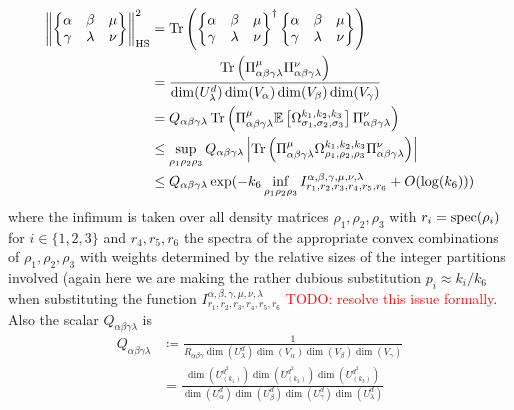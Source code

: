 \documentclass[notitlepage]{article}
\begin{document}
\begin{align}
    \left\lVert\begin{Bmatrix}\alpha & \beta & \mu \\ \gamma & \lambda & \nu \end{Bmatrix}\right\rVert_{\mathrm{HS}}^2
    &= \operatorname{Tr}\left(\begin{Bmatrix}\alpha & \beta & \mu \\ \gamma & \lambda & \nu \end{Bmatrix}^{\dagger}\begin{Bmatrix}\alpha & \beta & \mu \\ \gamma & \lambda & \nu \end{Bmatrix}\right) \\
    &= \frac{\operatorname{Tr}\left(\Pi_{\alpha\beta\gamma\lambda}^{\mu}\Pi_{\alpha\beta\gamma\lambda}^{\nu}\right)}{\dim(U^{d}_{\lambda})\dim(V_\alpha)\dim(V_{\beta})\dim(V_{\gamma})} \\
    &= Q_{\alpha\beta\gamma\lambda}\operatorname{Tr}\left(\Pi_{\alpha\beta\gamma\lambda}^{\mu} \mathbb E\left[\Omega_{\sigma_1,\sigma_2,\sigma_3}^{k_1, k_2, k_3}\right] \Pi_{\alpha\beta\gamma\lambda}^{\nu}\right)  \\
    &\leq \sup_{\rho_1 \rho_2 \rho_3} Q_{\alpha\beta\gamma\lambda}\left|\operatorname{Tr}\left(\Pi_{\alpha\beta\gamma\lambda}^{\mu}\Omega_{\rho_1,\rho_2,\rho_3}^{k_1, k_2, k_3} \Pi_{\alpha\beta\gamma\lambda}^{\nu}\right)\right|  \\
    &\leq Q_{\alpha\beta\gamma\lambda} \exp( - k_6 \inf_{\rho_1\rho_2\rho_3} I_{r_1, r_2, r_3, r_4, r_5, r_6}^{\alpha, \beta, \gamma, \mu, \nu, \lambda} + O(\log(k_6)))
\end{align}
where the infimum is taken over all density matrices $\rho_1, \rho_2, \rho_3$ with $r_i = \operatorname{spec}(\rho_i)$ for $i \in \{1,2,3\}$ and $r_4,r_5,r_6$ the spectra of the appropriate convex combinations of $\rho_1,\rho_2,\rho_3$ with weights determined by the relative sizes of the integer partitions involved (again here we are making the rather dubious substitution $p_i \approx k_i /k_6$ when substituting the function $I_{r_1, r_2, r_3, r_4, r_5, r_6}^{\alpha, \beta, \gamma, \mu, \nu, \lambda}$ \textcolor{red}{TODO: resolve this issue formally}.
Also the scalar $Q_{\alpha\beta\gamma\lambda}$ is
\begin{align}
    Q_{\alpha\beta\gamma\lambda} 
    &\coloneq \frac{1}{ R_{\alpha\beta\gamma} \dim(U^{d}_{\lambda}) \dim(V_\alpha) \dim(V_{\beta}) \dim(V_{\gamma})} \\
    &= \frac{\dim(U^{d^2}_{(k_1)})\dim(U^{d^2}_{(k_2)})\dim(U^{d^2}_{(k_3)})}{\dim(U^d_\alpha)\dim(U^d_{\beta})\dim(U^d_{\gamma})\dim(U^d_{\lambda})}
\end{align}
\end{document}
